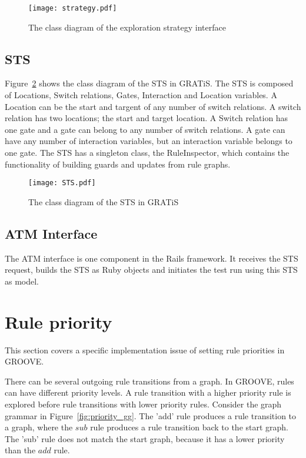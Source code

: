 \begin{figure}[ht]
  \begin{center}
    \texttt{[image: strategy.pdf]}
  \end{center}
  \caption{The class diagram of the exploration strategy interface}
  \label{fig:esi-diagram}
\end{figure}

\subsection{STS}\label{sec:sts-setup}
Figure~\ref{fig:sts-diagram} shows the class diagram of the STS in GRATiS. The STS is composed of Locations, Switch relations, Gates, Interaction and Location variables. A Location can be the start and targent of any number of switch relations. A switch relation has two locations; the start and target location. A Switch relation has one gate and a gate can belong to any number of switch relations. A gate can have any number of interaction variables, but an interaction variable belongs to one gate. The STS has a singleton class, the RuleInspector, which contains the functionality of building guards and updates from rule graphs.

\begin{figure}[ht]
  \begin{center}
    \texttt{[image: STS.pdf]}
  \end{center}
  \caption{The class diagram of the STS in GRATiS}
  \label{fig:sts-diagram}
\end{figure}

\subsection{ATM Interface}
The ATM interface is one component in the Rails framework. It receives the STS request, builds the STS as Ruby objects and initiates the test run using this STS as model.

\section{Rule priority}
This section covers a specific implementation issue of setting rule priorities in GROOVE.

There can be several outgoing rule transitions from a graph. In GROOVE, rules can have different priority levels. A rule transition with a higher priority rule is explored before rule transitions with lower priority rules. Consider the graph grammar in Figure~\ref{fig:priority_gg}. The 'add' rule produces a rule transition to a graph, where the $sub$ rule produces a rule transition back to the start graph. The 'sub' rule does not match the start graph, because it has a lower priority than the $add$ rule.

